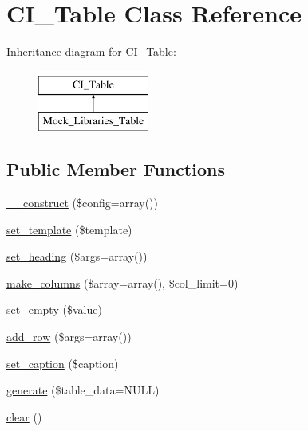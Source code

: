 \hypertarget{class_c_i___table}{}\section{C\+I\+\_\+\+Table Class Reference}
\label{class_c_i___table}
Inheritance diagram for C\+I\+\_\+\+Table\+:\begin{figure}[H]
\begin{center}
\leavevmode
\includegraphics[height=2.000000cm]{class_c_i___table}
\end{center}
\end{figure}
\subsection*{Public Member Functions}
\begin{DoxyCompactItemize}
\item 
\hyperlink{class_c_i___table_af7f9493844d2d66e924e3c1df51ce616}{\+\_\+\+\_\+construct} (\$config=array())
\item 
\hyperlink{class_c_i___table_ae65d1ab2a626d4ddfda31befc2b347f6}{set\+\_\+template} (\$template)
\item 
\hyperlink{class_c_i___table_ac35607094955ce966330d6af51d221ef}{set\+\_\+heading} (\$args=array())
\item 
\hyperlink{class_c_i___table_a816eac03a6a38820918890170fd7e0d0}{make\+\_\+columns} (\$array=array(), \$col\+\_\+limit=0)
\item 
\hyperlink{class_c_i___table_a20b008428100a2b740c02c4bcaa45cf6}{set\+\_\+empty} (\$value)
\item 
\hyperlink{class_c_i___table_aed032b02068e33116d9ecf9a0eedbbbe}{add\+\_\+row} (\$args=array())
\item 
\hyperlink{class_c_i___table_ab6146f0f242d4bc75169c8f8e622e979}{set\+\_\+caption} (\$caption)
\item 
\hyperlink{class_c_i___table_ad46f79939e16f261c19157809d56aab8}{generate} (\$table\+\_\+data=N\+U\+L\+L)
\item 
\hyperlink{class_c_i___table_aa821bec12eaa7e0f649397c9675ff505}{clear} ()
\end{DoxyCompactItemize}
